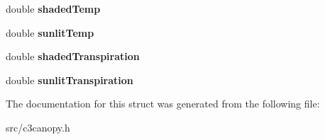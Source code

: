 \begin{DoxyCompactItemize}
\item 
\hypertarget{structcanopyoutput_a60bfe111f145fedb393ea6be43cb39b5}{double {\bfseries shaded\-Temp}}\label{structcanopyoutput_a60bfe111f145fedb393ea6be43cb39b5}

\item 
\hypertarget{structcanopyoutput_adef8aae7941699ce1039ce3fc711d3cc}{double {\bfseries sunlit\-Temp}}\label{structcanopyoutput_adef8aae7941699ce1039ce3fc711d3cc}

\item 
\hypertarget{structcanopyoutput_a60db316ce69f065a8ed0d8818ae7e51a}{double {\bfseries shaded\-Transpiration}}\label{structcanopyoutput_a60db316ce69f065a8ed0d8818ae7e51a}

\item 
\hypertarget{structcanopyoutput_a7c5b53f8aeb11b03d88cf41206ff41b0}{double {\bfseries sunlit\-Transpiration}}\label{structcanopyoutput_a7c5b53f8aeb11b03d88cf41206ff41b0}

\end{DoxyCompactItemize}


The documentation for this struct was generated from the following file\-:\begin{DoxyCompactItemize}
\item 
src/c3canopy.\-h\end{DoxyCompactItemize}
